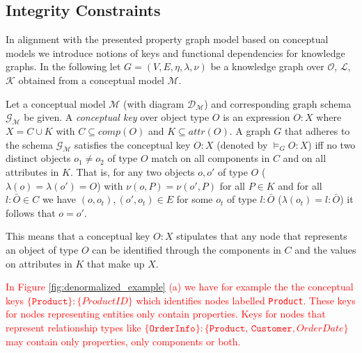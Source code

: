 \documentclass[sigconf]{acmart}
\begin{document}
\subsection{Integrity Constraints}

In alignment with the presented property graph model based on conceptual models we introduce notions of keys and functional dependencies for knowledge graphs. In the following let $G=(V,E,\eta,\lambda,\nu)$ be a knowledge graph over $\mathcal{O}$, $\mathcal{L}$, $\mathcal{K}$ obtained from a conceptual model $\mathcal{M}$.


\begin{definition}\label{def:cFD}
  Let a conceptual model $\mathcal{M}$ (with diagram $\mathcal{D_M}$) and corresponding graph schema $\mathcal{G}_\mathcal{M}$ be given. A \emph{conceptual key} over object type $O$ is an expression $O : X$ where $X = C \cup K$  with $C\subseteq comp(O)$ and $K\subseteq attr(O)$. A graph $G$ that adheres to the schema $\mathcal{G}_\mathcal{M}$ satisfies the conceptual key $O : X$ (denoted by $\models_G O : X$) iff no two distinct objects $o_1 \neq o_2$ of type $O$ match on all components in $C$ and on all attributes in $K$. That is, for any two objects $o,o'$ of type $O$ ($\lambda(o) = \lambda(o') = O$) with $\nu(o,P) = \nu(o',P)$ for all $P \in K$ and for all $l:\bar{O} \in C$ we have $(o, o_t), (o', o_t) \in E$ for some $o_t$ of type $l:\bar{O}$ ($\lambda(o_t) = l:\bar{O}$) it follows that $o = o'$.
\end{definition}

This means that a conceptual key $O : X$ stipulates that any node that represents an object of type $O$ can be identified through the components in $C$ and the values on attributes in $K$ that make up $X$.

\textcolor{red}{In Figure \ref{fig:denormalized_example} (a) we have for example the the conceptual keys $\{\texttt{Product}\}:\{\textit{ProductID}\}$ which identifies nodes labelled \texttt{Product}. These keys for nodes representing entities only contain properties. Keys for nodes that represent relationship types like $\{\texttt{OrderInfo}\}:\{\texttt{Product, Customer},\textit{OrderDate}\}$ may contain only properties, only components or both.}
\end{document}
